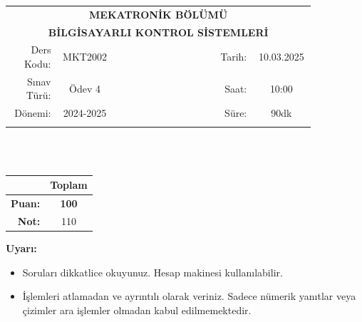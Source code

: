 \newcommand\UniversiteAdi{Niğde Ömer Halisdemir Üniversitesi}
\newcommand\BolumAdi{MEKATRONİK BÖLÜMÜ}
\newcommand\DersKodu{MKT2002}
\newcommand\DersAdi{BİLGİSAYARLI KONTROL SİSTEMLERİ}
\newcommand\SinavAdi{Ödev 4}
\newcommand\SinavTarihi{10.03.2025}
\newcommand\SinavSaati{10:00}
\newcommand\SinavSuresi{90dk}

\pagestyle{fancy}
\fancyhf{} %
\noindent
\begin{tabular}{
    p{0.15\linewidth}
    p{0.15\linewidth}
    p{0.3\linewidth}
    p{0.1\linewidth}
    p{0.15\linewidth}}
    \multicolumn{5}{c}{\textbf{\BolumAdi}}\\
    \multicolumn{5}{c}{\textbf{\DersAdi}}\\\hline
    \multicolumn{1}{|r|}{Ders Kodu:}&
    \multicolumn{1}{|c|}{\DersKodu}&
    \multicolumn{1}{|c|}{}& 
    \multicolumn{1}{|r|}{Tarih:}&
    \multicolumn{1}{|c|}{\SinavTarihi} \\\hline
    \multicolumn{1}{|r|}{Sınav Türü:}&
    \multicolumn{1}{|c|}{\SinavAdi}&  
    \multicolumn{1}{|c|}{}&
    \multicolumn{1}{|r|}{Saat:}&
    \multicolumn{1}{|c|}{\SinavSaati}\\\hline
    \multicolumn{1}{|r|}{Dönemi:}&
    \multicolumn{1}{|c|}{2024-2025}&
    \multicolumn{1}{|c|}{}&
    \multicolumn{1}{|r|}{Süre:}&
    \multicolumn{1}{|c|}{\SinavSuresi} \\\hline
    &&&&\\
\end{tabular}\\\\
\noindent\begin{center}
\begin{tabular}{|r|c|}\hline
    &\textbf{Toplam}\\\hline
    \textbf{Puan:} &\textbf{100}\\\hline
    \textbf{Not:}  &110\\\hline
\end{tabular}\end{center}
\noindent\textbf{Uyarı:}
\begin{itemize}\bfseries
    \item Soruları dikkatlice okuyunuz. Hesap makinesi kullanılabilir.
    \item İşlemleri atlamadan ve ayrıntılı olarak veriniz. Sadece nümerik yanıtlar veya çizimler ara işlemler olmadan kabul edilmemektedir.
\end{itemize}

